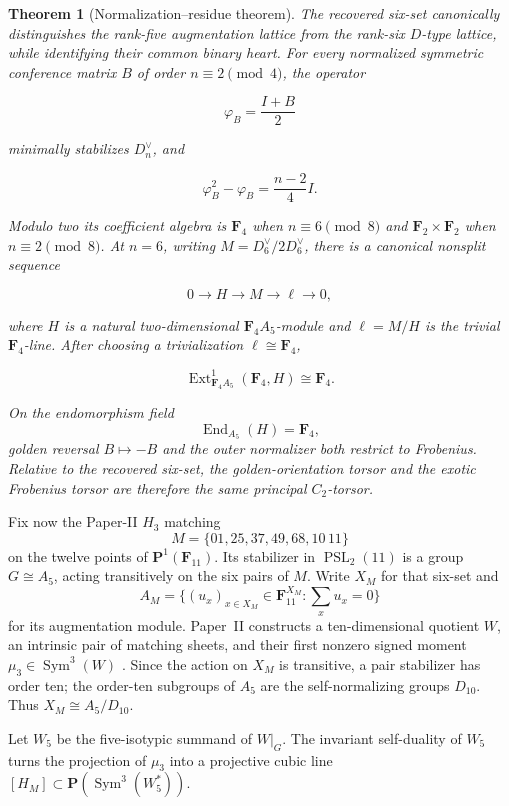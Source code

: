 \documentclass[11pt]{article}
\newtheorem{theorem}{Theorem}[section]
\theoremstyle{definition}
\theoremstyle{remark}
\newcommand{\F}{\mathbf F}
\newcommand{\PP}{\mathbf P}
\newcommand{\Sym}{\operatorname{Sym}}
\newcommand{\End}{\operatorname{End}}
\newcommand{\Ext}{\operatorname{Ext}}
\begin{document}
\begin{theorem}[Normalization--residue theorem]
\label{thm:normalization-residue-intro}
The recovered six-set canonically distinguishes the rank-five augmentation
lattice from the rank-six \(D\)-type lattice, while identifying their common
binary heart.  For every normalized symmetric conference matrix \(B\) of
order \(n\equiv2\pmod4\), the operator

\[
                         \varphi_B=\frac{I+B}{2}
\]

minimally stabilizes \(D_n^\vee\), and

\[
       \varphi_B^2-\varphi_B=\frac{n-2}{4}I.
\]

Modulo two its coefficient algebra is \(\F_4\) when \(n\equiv6\pmod8\) and
\(\F_2\times\F_2\) when \(n\equiv2\pmod8\).  At \(n=6\), writing
\(M=D_6^\vee/2D_6^\vee\), there is a canonical nonsplit sequence

\[
 0\longrightarrow H\longrightarrow M\longrightarrow\ell\longrightarrow0,
\]

where \(H\) is a natural two-dimensional \(\F_4A_5\)-module and
\(\ell=M/H\) is the trivial \(\F_4\)-line.  After choosing a trivialization
\(\ell\cong\F_4\),

\[
       \Ext^1_{\F_4A_5}(\F_4,H)\cong\F_4.
\]

On the endomorphism field
\[
                         \End_{A_5}(H)=\F_4,
\]
golden reversal \(B\mapsto-B\) and the outer normalizer both restrict to
Frobenius.  Relative to the recovered six-set, the golden-orientation torsor
and the exotic Frobenius torsor are therefore the same principal
\(C_2\)-torsor.
\end{theorem}

Fix now the Paper-II \(H_3\) matching
\[
 M=\{01,25,37,49,68,10\,11\}
\]
on the twelve points of \(\PP^1(\F_{11})\).  Its stabilizer in
\(\operatorname{PSL}_2(11)\) is a group \(G\cong A_5\), acting transitively
on the six pairs of \(M\).  Write \(X_M\) for that six-set and
\[
 A_M=\bigl\{(u_x)_{x\in X_M}\in\F_{11}^{X_M}:
                 \textstyle\sum_xu_x=0\bigr\}
\]
for its augmentation module.  Paper~II constructs a ten-dimensional
quotient \(W\), an intrinsic pair of matching sheets, and their first
nonzero signed moment \(\mu_3\in\Sym^3(W)\)
\cite{RuddFactorization2026}.
Since the action on \(X_M\) is transitive, a pair stabilizer has order ten;
the order-ten subgroups of \(A_5\) are the self-normalizing groups
\(D_{10}\).  Thus \(X_M\cong A_5/D_{10}\).

Let \(W_5\) be the five-isotypic summand of \(W|_G\).  The invariant
self-duality of \(W_5\) turns the projection of \(\mu_3\) into a projective
cubic line \([H_M]\subset\PP(\Sym^3(W_5^*))\).
\end{document}
